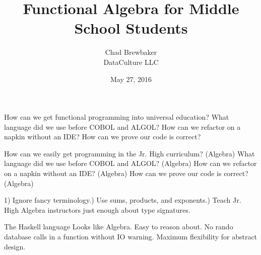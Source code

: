 \documentclass{beamer}
\title{Functional Algebra for Middle School Students}
\author{Chad Brewbaker\\ DataCulture LLC}
\date{May 27, 2016}
\begin{document}
\frame{\titlepage}


%

\begin{frame}[fragile]
How can we get functional programming into universal education?\newline
\newline
What language did we use before COBOL and ALGOL?\newline
\newline
How can we refactor on a napkin without an IDE?\newline
\newline
How can we prove our code is correct?

\end{frame}


\begin{frame}[fragile]
How can we easily get programming in the Jr. High curriculum?\newline
(Algebra)\newline
What language did we use before COBOL and ALGOL?\newline
(Algebra)\newline
How can we refactor on a napkin without an IDE?\newline
(Algebra)\newline
How can we prove our code is correct?\newline
(Algebra)
\end{frame}


\begin{frame}[fragile]
1) Ignore fancy terminology.\newline{}) Use sums, products, and exponents.\newline{}) Teach Jr. High Algebra instructors just enough about type signatures.  
\end{frame}


\begin{frame}[fragile]
The Haskell language\newline\newline
Looks like Algebra. \newline\newline
Easy to reason about. No rando database calls in a function without IO warning.\newline\newline
Maximum flexibility for abstract design.
\end{frame}
\end{document}
